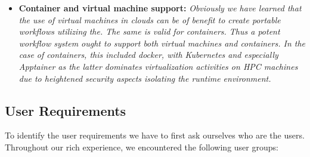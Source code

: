 \documentclass[utf8]{FrontiersinVancouver} %
\begin{document}
\begin{BOX}
\begin{itemize}
{     integrated into the scientific research and benchmark efforts.}
 \item {\bf Container and virtual machine support:} {\it Obviously we
     have learned that the use of virtual machines in clouds can be of
     benefit to create portable workflows utilizing the. The same is
     valid for containers. Thus a potent workflow system ought to
     support both virtual machines and containers. In the case of
     containers, this included docker, with Kubernetes and especially Apptainer as the latter
     dominates virtualization activities on HPC machines due to heightened security aspects
     isolating the runtime environment. }
  \end{itemize}
\end{BOX}

\subsection{User Requirements}
\label{sec:user-requirements}

To identify the user requirements we have to first ask ourselves who are the users. Throughout our rich experience, we encountered the following user groups:
\end{document}
